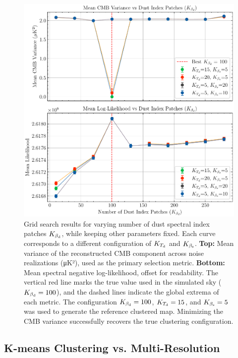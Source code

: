 \documentclass[fleqn,usenatbib]{mnras}
\begin{document}
\begin{figure}
    \centering
    \includegraphics[width=\linewidth]{figures/validation_likelihood_vs_variance.pdf}
    \caption{
    Grid search results for varying number of dust spectral index patches \( K_{\beta_{\rm d}} \), while keeping other parameters fixed.
    Each curve corresponds to a different configuration of \( K_{T_{\rm d}} \) and \( K_{\beta_{\rm s}} \).
    \textbf{Top:} Mean variance of the reconstructed CMB component across noise realizations (μK²), used as the primary selection metric.
    \textbf{Bottom:} Mean spectral negative log-likelihood, offset for readability.
    The vertical red line marks the true value used in the simulated sky (\( K_{\beta_{\rm d}} = 100 \)), and the dashed lines indicate the global extrema of each metric.
    The configuration \( K_{\beta_{\rm d}} = 100 \), \( K_{T_{\rm d}} = 15 \), and \( K_{\beta_{\rm s}} = 5 \) was used to generate the reference clustered map.
    Minimizing the CMB variance successfully recovers the true clustering configuration.
    }

    \label{fig:grid_search_summary}
\end{figure}


\subsection{K-means Clustering vs. Multi-Resolution}
\label{subsec:comparison_setup}
\end{document}
